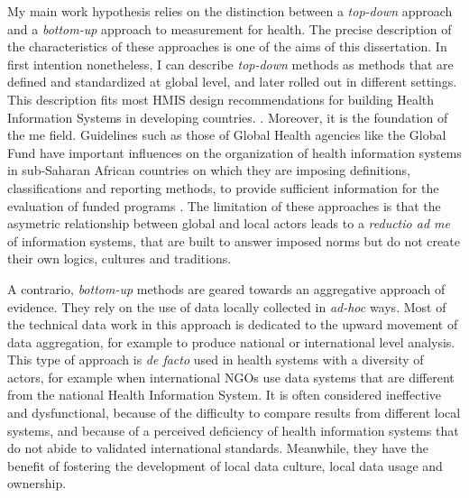 My main work hypothesis relies on the distinction between a \textit{top-down} approach and a \textit{bottom-up} approach to measurement for health. The precise description of the characteristics of these approaches is one of the aims of this dissertation. In first intention nonetheless, I can describe \textit{top-down} methods as methods that are defined and standardized at global level, and later rolled out in different settings. This description fits most HMIS design recommendations for building Health Information Systems in developing countries. \citep{lippeveld_routine_2000,rhino_introducing_2003,daltilia_systeme_2005,health_metrics_network_framework_2008}. Moreover, it is the foundation of the \gls{me} field. Guidelines such as those of Global Health agencies like the Global Fund have important influences on the organization of health information systems in sub-Saharan African countries on which they are imposing definitions, classifications and reporting methods, to provide sufficient information for the evaluation of funded programs \citep{the_global_fund_global_2014}. The limitation of these approaches is that the asymetric relationship between global and local actors leads to a \textit{reductio ad \gls{me}} of information systems, that are built to answer imposed norms but do not create their own logics, cultures and traditions.


A contrario, \textit{bottom-up} methods are geared towards an aggregative approach of evidence. They rely on the use of data  locally collected in \textit{ad-hoc} ways. Most of the technical data work in this approach is dedicated to the upward movement of data aggregation, for example to produce national or international level analysis. This type of approach is \textit{de facto} used in health systems with a diversity of actors, for example when international NGOs use data systems that are different from the national Health Information System. It is often considered ineffective and dysfunctional, because of the difficulty to compare results from different local systems, and because of a perceived deficiency of health information systems that do not abide to validated international standards. Meanwhile, they have the benefit of fostering the development of local data culture, local data usage and ownership.

